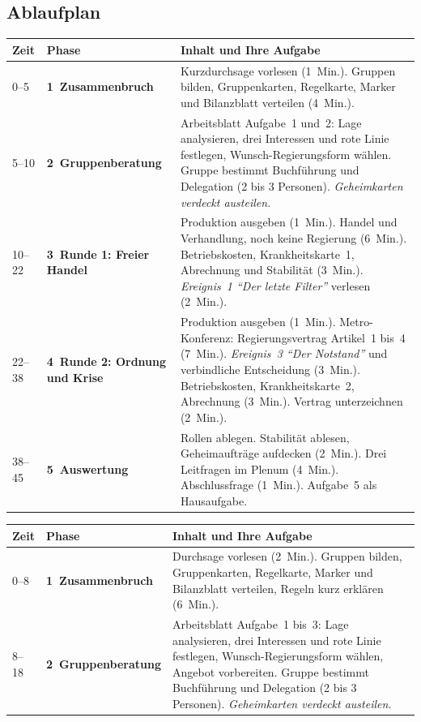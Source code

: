 \subsection*{Ablaufplan}
\setlength{\parindent}{0pt}
\begin{center}
{\renewcommand{\arraystretch}{1.25}\small
\ifkurz
\begin{longtable}{|p{1.5cm}|p{3.5cm}|p{\dimexpr\textwidth-5cm-6\tabcolsep-4\arrayrulewidth\relax}|}
\hline
\textbf{Zeit} & \textbf{Phase} & \textbf{Inhalt und Ihre Aufgabe} \\ \hline
\endhead
0--5 & \textbf{1~Zusammenbruch} & Kurzdurchsage vorlesen (1~Min.). Gruppen bilden, Gruppenkarten, Regelkarte, Marker und Bilanzblatt verteilen (4~Min.). \\ \hline
5--10 & \textbf{2~Gruppenberatung} & Arbeitsblatt Aufgabe~1 und~2: Lage analysieren, drei Interessen und rote Linie festlegen, Wunsch-Regierungsform wählen. Gruppe bestimmt Buchführung und Delegation (2 bis 3 Personen). \emph{Geheimkarten verdeckt austeilen.} \\ \hline
10--22 & \textbf{3~Runde 1: Freier Handel} & Produktion ausgeben (1~Min.). Handel und Verhandlung, noch keine Regierung (6~Min.). Betriebskosten, Krankheitskarte~1, Abrechnung und Stabilität (3~Min.). \emph{Ereignis~1 \enquote{Der letzte Filter}} verlesen (2~Min.). \\ \hline
22--38 & \textbf{4~Runde 2: Ordnung und Krise} & Produktion ausgeben (1~Min.). Metro-Konferenz: Regierungsvertrag Artikel~1 bis~4 (7~Min.). \emph{Ereignis~3 \enquote{Der Notstand}} und verbindliche Entscheidung (3~Min.). Betriebskosten, Krankheitskarte~2, Abrechnung (3~Min.). Vertrag unterzeichnen (2~Min.). \\ \hline
38--45 & \textbf{5~Auswertung} & Rollen ablegen. Stabilität ablesen, Geheimaufträge aufdecken (2~Min.). Drei Leitfragen im Plenum (4~Min.). Abschlussfrage (1~Min.). Aufgabe~5 als Hausaufgabe. \\ \hline
\end{longtable}
\else
\begin{longtable}{|p{1.5cm}|p{3.5cm}|p{\dimexpr\textwidth-5cm-6\tabcolsep-4\arrayrulewidth\relax}|}
\hline
\textbf{Zeit} & \textbf{Phase} & \textbf{Inhalt und Ihre Aufgabe} \\ \hline
\endhead
0--8 & \textbf{1~Zusammenbruch} & Durchsage vorlesen (2~Min.). Gruppen bilden, Gruppenkarten, Regelkarte, Marker und Bilanzblatt verteilen, Regeln kurz erklären (6~Min.). \\ \hline
8--18 & \textbf{2~Gruppenberatung} & Arbeitsblatt Aufgabe~1 bis~3: Lage analysieren, drei Interessen und rote Linie festlegen, Wunsch-Regierungsform wählen, Angebot vorbereiten. Gruppe bestimmt Buchführung und Delegation (2 bis 3 Personen). \emph{Geheimkarten verdeckt austeilen.} \\ \hline

\end{longtable}}
\end{center}
